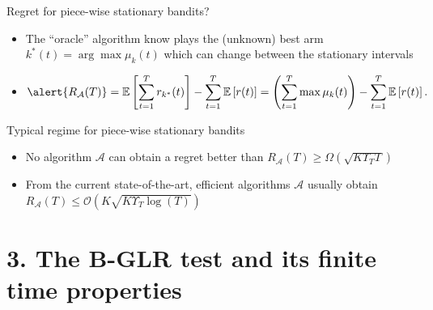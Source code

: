 \documentclass[11pt,english,ignorenonframetext,]{beamer}
\begin{document}
\begin{frame}{Regret for piece-wise stationary bandits?}

\begin{itemize}
  \item
  The ``oracle'' algorithm know plays the (unknown) best arm $k^*(t) = \arg\max \mu_k(t)$
  which can change between the stationary intervals

  \item
  \[ \alert{ R_{\mathcal{A}}(T) } = \mathbb{E}\left[ \sum\limits_{t=1}^T r_{k^*}(t) \right] - \sum\limits_{t=1}^T \mathbb{E}\left[ r(t) \right] = \left(\sum_{t=1}^T \max \mu_k(t) \right) - \sum\limits_{t=1}^T \mathbb{E}\left[ r(t) \right]. \]
\end{itemize}

\pause
\vspace*{10pt}

\begin{exampleblock}{Typical regime for piece-wise stationary bandits}
  \begin{itemize}
  \item
  No algorithm $\mathcal{A}$ can obtain a regret better than
  \hfill{}
  $R_{\mathcal{A}}(T) \geq \Omega(\sqrt{K \Upsilon_T T})$

  \item
  From the current state-of-the-art, efficient algorithms $\mathcal{A}$ usually obtain
  \hfill{}
  $R_{\mathcal{A}}(T) \leq \mathcal{O}(K \sqrt{K \Upsilon_T \log(T)})$
  \end{itemize}
\end{exampleblock}

\end{frame}


\section{\hfill{}3. The B-GLR test and its finite time properties\hfill{}}
\end{document}
